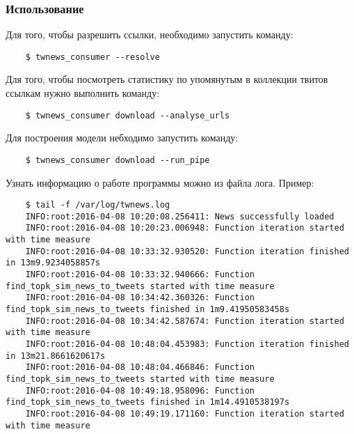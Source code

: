         \subsubsection{Использование}
            Для того, чтобы разрешить ссылки, необходимо запустить команду:
            \begin{lstlisting}
    $ twnews_consumer --resolve
            \end{lstlisting}

            Для того, чтобы посмотреть статистику по упомянутым в коллекции твитов ссылкам нужно выполнить команду:
            \begin{lstlisting}
    $ twnews_consumer download --analyse_urls
            \end{lstlisting}

            Для построения модели небходимо запустить команду:
            \begin{lstlisting}
    $ twnews_consumer download --run_pipe
            \end{lstlisting}

            Узнать информацию о работе программы можно из файла лога. Пример:
            \begin{lstlisting}
    $ tail -f /var/log/twnews.log
    INFO:root:2016-04-08 10:20:08.256411: News successfully loaded
    INFO:root:2016-04-08 10:20:23.006948: Function iteration started with time measure
    INFO:root:2016-04-08 10:33:32.930520: Function iteration finished in 13m9.9234058857s
    INFO:root:2016-04-08 10:33:32.940666: Function find_topk_sim_news_to_tweets started with time measure
    INFO:root:2016-04-08 10:34:42.360326: Function find_topk_sim_news_to_tweets finished in 1m9.41950583458s
    INFO:root:2016-04-08 10:34:42.587674: Function iteration started with time measure
    INFO:root:2016-04-08 10:48:04.453983: Function iteration finished in 13m21.8661620617s
    INFO:root:2016-04-08 10:48:04.466846: Function find_topk_sim_news_to_tweets started with time measure
    INFO:root:2016-04-08 10:49:18.958096: Function find_topk_sim_news_to_tweets finished in 1m14.4910538197s
    INFO:root:2016-04-08 10:49:19.171160: Function iteration started with time measure
            \end{lstlisting}